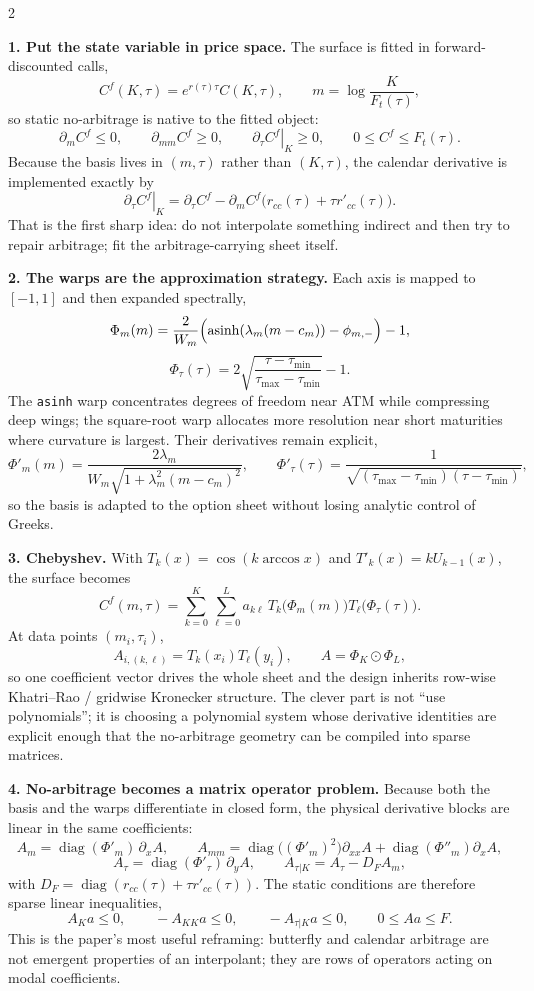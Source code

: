 \documentclass[10pt]{article}
\begin{document}
\begin{multicols}{2}

\textbf{\color{ink}1. Put the state variable in price space.} The surface is fitted in forward-discounted calls,
\[
C^f(K,\tau)=e^{r(\tau)\tau}C(K,\tau), \qquad m=\log\!\frac{K}{F_t(\tau)},
\]
so static no-arbitrage is native to the fitted object:
\[
\partial_m C^f\le 0,\qquad \partial_{mm}C^f\ge 0,\qquad \left.\partial_\tau C^f\right|_K\ge 0,\qquad 0\le C^f\le F_t(\tau).
\]
Because the basis lives in $(m,\tau)$ rather than $(K,\tau)$, the calendar derivative is implemented exactly by
\[
\left.\partial_\tau C^f\right|_K=\partial_\tau C^f-\partial_m C^f\bigl(r_{cc}(\tau)+\tau r'_{cc}(\tau)\bigr).
\]
That is the first sharp idea: do not interpolate something indirect and then try to repair arbitrage; fit the arbitrage-carrying sheet itself. 

\textbf{\color{ink}2. The warps are the approximation strategy.} Each axis is mapped to $[-1,1]$ and then expanded spectrally,
\[
\Phi_m(m)=\frac{2}{W_m}\Bigl(\operatorname{asinh}(\lambda_m(m-c_m))-\phi_{m,-}\Bigr)-1,
\]
\[
\Phi_\tau(\tau)=2\sqrt{\frac{\tau-\tau_{\min}}{\tau_{\max}-\tau_{\min}}}-1.
\]
The \texttt{asinh} warp concentrates degrees of freedom near ATM while compressing deep wings; the square-root warp allocates more resolution near short maturities where curvature is largest. Their derivatives remain explicit,
\[
\Phi'_m(m)=\frac{2\lambda_m}{W_m\sqrt{1+\lambda_m^2(m-c_m)^2}},\qquad
\Phi'_\tau(\tau)=\frac{1}{\sqrt{(\tau_{\max}-\tau_{\min})(\tau-\tau_{\min})}},
\]
so the basis is adapted to the option sheet without losing analytic control of Greeks.

\textbf{\color{ink}3. Chebyshev.} With $T_k(x)=\cos(k\arccos x)$ and $T'_k(x)=kU_{k-1}(x)$, the surface becomes
\[
C^f(m,\tau)=\sum_{k=0}^{K}\sum_{\ell=0}^{L}a_{k\ell}\,T_k\!\bigl(\Phi_m(m)\bigr)T_\ell\!\bigl(\Phi_\tau(\tau)\bigr).
\]
At data points $(m_i,\tau_i)$,
\[
A_{i,(k,\ell)}=T_k(x_i)T_\ell(y_i), \qquad A=\Phi_K\odot\Phi_L,
\]
so one coefficient vector drives the whole sheet and the design inherits row-wise Khatri--Rao / gridwise Kronecker structure. The clever part is not ``use polynomials''; it is choosing a polynomial system whose derivative identities are explicit enough that the no-arbitrage geometry can be compiled into sparse matrices.

\columnbreak

\textbf{\color{ink}4. No-arbitrage becomes a matrix operator problem.} Because both the basis and the warps differentiate in closed form, the physical derivative blocks are linear in the same coefficients:
\[
A_m=\operatorname{diag}(\Phi'_m)\,\partial_xA,\qquad
A_{mm}=\operatorname{diag}\!\bigl((\Phi'_m)^2\bigr)\partial_{xx}A+\operatorname{diag}(\Phi''_m)\partial_xA,
\]
\[
A_\tau=\operatorname{diag}(\Phi'_\tau)\,\partial_yA,\qquad
A_{\tau|K}=A_\tau-D_FA_m,
\]
with $D_F=\operatorname{diag}(r_{cc}(\tau)+\tau r'_{cc}(\tau))$. The static conditions are therefore sparse linear inequalities,
\[
A_Ka\le 0,\qquad -A_{KK}a\le 0,\qquad -A_{\tau|K}a\le 0,\qquad 0\le Aa\le F.
\]
This is the paper's most useful reframing: butterfly and calendar arbitrage are not emergent properties of an interpolant; they are rows of operators acting on modal coefficients.


\end{multicols}
\end{document}
